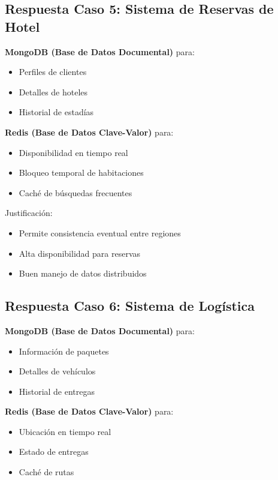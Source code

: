 \documentclass[12pt]{article}
\begin{document}
\subsection{Respuesta Caso 5: Sistema de Reservas de Hotel}

\textbf{MongoDB (Base de Datos Documental)} para:
\begin{itemize}
    \item Perfiles de clientes
    \item Detalles de hoteles
    \item Historial de estadías
\end{itemize}

\textbf{Redis (Base de Datos Clave-Valor)} para:
\begin{itemize}
    \item Disponibilidad en tiempo real
    \item Bloqueo temporal de habitaciones
    \item Caché de búsquedas frecuentes
\end{itemize}

Justificación:
\begin{itemize}
    \item Permite consistencia eventual entre regiones
    \item Alta disponibilidad para reservas
    \item Buen manejo de datos distribuidos
\end{itemize}

\subsection{Respuesta Caso 6: Sistema de Logística}

\textbf{MongoDB (Base de Datos Documental)} para:
\begin{itemize}
    \item Información de paquetes
    \item Detalles de vehículos
    \item Historial de entregas
\end{itemize}

\textbf{Redis (Base de Datos Clave-Valor)} para:
\begin{itemize}
    \item Ubicación en tiempo real
    \item Estado de entregas
    \item Caché de rutas
\end{itemize}
\end{document}
